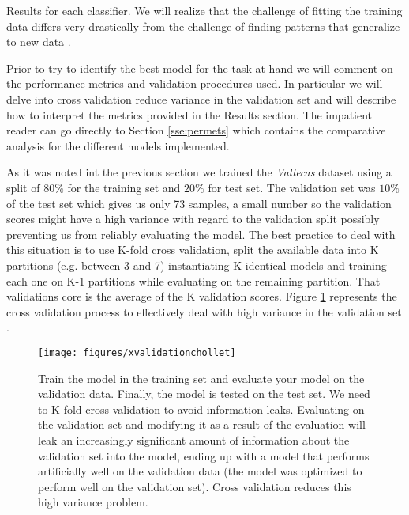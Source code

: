 \documentclass[11pt]{article}
\theoremstyle{definition}
\theoremstyle{remark}
\begin{document}
Results for each classifier. We will realize that the challenge of fitting the training data differs very drastically from the challenge of finding patterns that generalize to new data \cite{goodfellow2016deep}.



Prior to try to identify the best model for the task at hand we will comment on the performance metrics and validation procedures used. In particular we will delve into cross validation reduce variance in the validation set and will describe how to interpret the metrics provided in the Results section. The impatient reader can go directly to Section \ref{sse:permets} which contains the comparative analysis for the different models implemented.

As it was noted int the previous section we trained the \emph{Vallecas} dataset using a split of $80\%$ for the training set and $20\%$ for test set. The validation set was $10\%$ of the test set which gives us only 73 samples, a small number so the validation scores might have a high variance with regard to the validation split possibly preventing us from reliably evaluating the model. The best practice to deal with this situation is to use K-fold cross validation, split the available data into K partitions (e.g. between 3 and 7) instantiating K identical models and training each one on K-1 partitions while evaluating on the remaining partition. That validations core is the average of the K validation scores. Figure \ref{fig:xvalchollet} represents the cross validation process to effectively deal with high variance in the validation set \cite{chollet2017deep}. 
\begin{figure}[H]
        \centering
        \texttt{[image: figures/xvalidationchollet]}
        \caption{Train the model in the training set and evaluate your model on the validation data. Finally, the model is tested on the test set. We need to K-fold cross validation to avoid information leaks. Evaluating on the validation set and modifying it as a result of the evaluation will leak an increasingly significant amount of information about the validation set into the model, ending up with a model that performs artificially well on the validation data (the model was optimized to perform well on the validation set). Cross validation reduces this high variance problem.} \label{fig:xvalchollet}
\end{figure}
\end{document}
